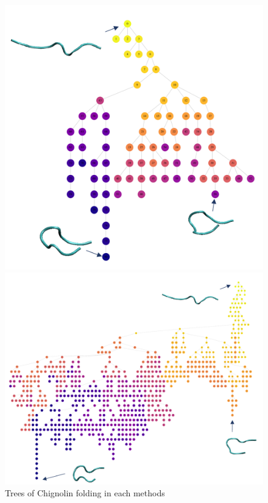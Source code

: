 \begin{figure}[t]
\begin{minipage}{0.3\hsize}
 \end{minipage}
 \begin{minipage}{0.6\hsize}
 \centering
 \includegraphics[scale=0.3]{Figures/tree_chi_pats.pdf}
 \end{minipage}
\begin{minipage}{0.95\hsize}
\centering
\includegraphics[scale=0.5]{Figures/tree_chi_pats_penal.pdf}
\end{minipage}
\caption{Trees of Chignolin folding in each methods}
\label{fig:tree_chig}
\end{figure}

